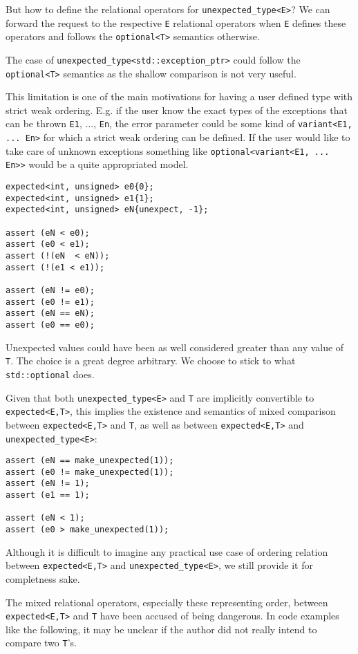 \documentclass[a4paper,10pt]{article}
\newcommand{\cpp}[1]{\lstinline{#1}}
\begin{document}
But how to define the relational operators for \cpp{unexpected_type<E>}? We can forward the request to the respective \cpp{E} relational operators when \cpp{E} defines these operators and follows the \cpp{optional<T>} semantics otherwise. 

The case of \cpp{unexpected_type<std::exception_ptr>} could follow the \cpp{optional<T>} semantics as the shallow comparison is not very useful.

This limitation is one of the main motivations for having a user defined type with strict weak ordering. E.g. if the user know the exact types of the exceptions that can be thrown \cpp{E1}, ..., \cpp{En}, the error parameter could be some kind of \cpp{variant<E1, ... En>} for which a strict weak ordering can be defined. If the user would like to take care of unknown exceptions something like \cpp{optional<variant<E1, ... En>>} would be a quite appropriated model. 

\begin{lstlisting}
expected<int, unsigned> e0{0};
expected<int, unsigned> e1{1};
expected<int, unsigned> eN{unexpect, -1};

assert (eN < e0);
assert (e0 < e1);
assert (!(eN  < eN));
assert (!(e1 < e1));

assert (eN != e0);
assert (e0 != e1);
assert (eN == eN);
assert (e0 == e0);
\end{lstlisting}

Unexpected values could have been as well considered greater than any value of \cpp{T}. The choice is a great degree arbitrary. We choose to stick to what \cpp{std::optional} does.

Given that both \cpp{unexpected_type<E>} and \cpp{T} are implicitly convertible to \cpp{expected<E,T>}, this implies the existence and semantics of mixed comparison between \cpp{expected<E,T>} and \cpp{T}, as well as between \cpp{expected<E,T>} and \cpp{unexpected_type<E>}:

\begin{lstlisting}
assert (eN == make_unexpected(1));
assert (e0 != make_unexpected(1));
assert (eN != 1);
assert (e1 == 1);

assert (eN < 1);
assert (e0 > make_unexpected(1));
\end{lstlisting}

Although it is difficult to imagine any practical use case of ordering relation between \cpp{expected<E,T>} and \cpp{unexpected_type<E>}, we still provide it for completness sake.

The mixed relational operators, especially these representing order, between \cpp{expected<E,T>} and \cpp{T} have been accused of being dangerous. In code examples like the following, it may be unclear if the author did not really intend to compare two \cpp{T}'s.
\end{document}
